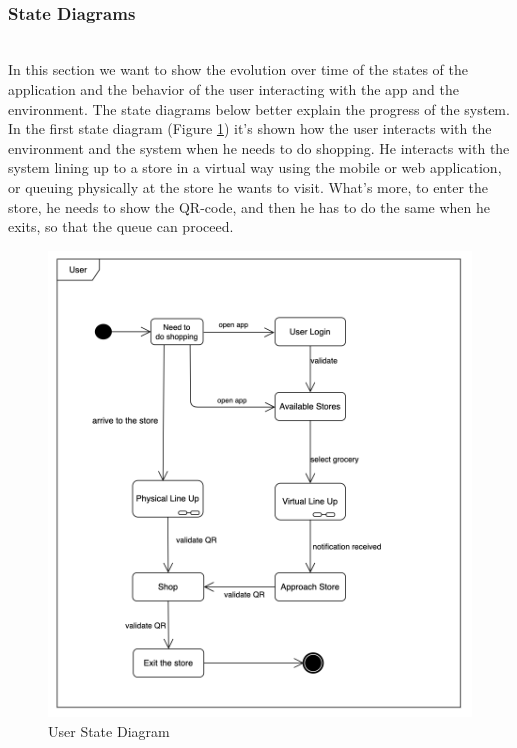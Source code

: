 \documentclass[]{article}
\begin{document}
	\textbf{}\\
		\subsubsection{State Diagrams}
		
		\textbf{}\\ \newline
		In this section we want to show the evolution over time of the states of the application and the behavior of the user interacting with the app and the environment. 
The state diagrams below better explain the progress of the system.
		\newline
		\newline
		\newline
		In the first state diagram (Figure \ref{fig:state_diagram1}) it’s shown how the user interacts with the environment and the system when he needs to do shopping. He interacts with the system lining up to a store in a virtual way using the mobile or web application, or queuing physically at the store he wants to visit.
		What’s more, to enter the store, he needs to show the QR-code, and then he has to do the same when he exits, so that the queue can proceed. \\
		
		\begin{figure}[H]
			\centering
			\includegraphics[scale=0.8]{User_statediagram.png}
			\caption{User State Diagram}
			\label{fig:state_diagram1}
		\end{figure}
		
\end{document}
